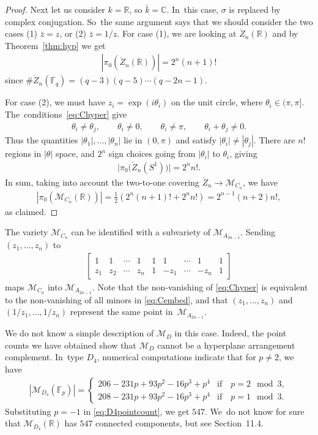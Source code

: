 \documentclass[pdftex]{sigma}%
\def\R{{\mathbb R}}
\def\C{{\mathbb C}}
\def\F{{\mathbb F}}
\def\Uo{{\mathring{U}}}
\def\Zo{{\mathring{Z}}}
\def\M{{\mathcal{M}}}
\numberwithin{equation}{section}
\begin{document}
\begin{proof}
Next let us consider $k = \R$, so $\bar k = \C$. In~this case, $\sigma$ is replaced by complex conjugation. So~the same argument says that we should consider the two cases (1) $\bar z = z$, or (2) $\bar z = 1/z$. For case (1), we are looking at $\Zo_n(\R)$ and by Theorem~\ref{thm:hyp} we get
\begin{gather*}
|\pi_0(\Zo_n(\R))| = 2^{n} (n+1)!
\end{gather*}
since $\#\Zo_n(\F_q) = (q-3)(q-5)\cdots (q-2n-1)$.

For case (2), we must have $z_i = \exp(i \theta_i)$ on the unit circle, where $\theta_i \in (\pi,\pi]$. The~conditions~\eqref{eq:Chyper} give
\begin{gather*}
\theta_i \neq \theta_j, \qquad \theta_i \neq 0, \qquad \theta_i \neq \pi, \qquad \theta_i + \theta_j \neq 0.
\end{gather*}
Thus the quantities $|\theta_1|,\dots, |\theta_n|$ lie in $(0,\pi)$ and satisfy $|\theta_i| \neq |\theta_j|$. There are $n!$ regions in $|\theta|$ space, and $2^n$ sign choices going from $|\theta_i|$ to $\theta_i$, giving
\begin{gather*}
\big|\pi_0\big(\Zo_n(S^1)\big)\big| = 2^n n!.
\end{gather*}
In sum, taking into account the two-to-one covering $\Zo_n \to \M_{C_n}$, we have
\begin{gather*}
|\pi_0( \M_{C_n}(\R))| = \frac{1}{2}\left( 2^n (n+1)! + 2^n n!\right) = 2^{n-1}(n+2) n!,
\end{gather*}
as claimed.
\end{proof}

The variety $\M_{C_n}$ can be identified with a subvariety of $\M_{A_{2n-1}}$. Sending $(z_1,\dots,z_n)$ to
\begin{gather}\label{eq:Cembed}
\begin{bmatrix}
1& 1 & \cdots & 1 &1 & 1 &\cdots &1&1
\\
z_1 & z_2 & \cdots & z_{n} & 1 & -z_1 & \cdots & -z_n & 1
\end{bmatrix}
\end{gather}
maps $\M_{C_n}$ into $\M_{A_{2n-1}}$. Note that the non-vanishing of \eqref{eq:Chyper} is equivalent to the non-vanishing of all minors in \eqref{eq:Cembed}, and that $(z_1,\dots,z_n)$ and $(1/z_1,\dots,1/z_n)$ represent the same point in~$\M_{A_{2n-1}}$.

\bigskip{}
We do not know a simple description of $\M_D$ in this case. Indeed, the point counts we have obtained show that $\M_D$ cannot be a hyperplane arrangement complement. In~type $D_4$, numerical computations indicate that for $p \neq 2$, we have
\begin{gather}\label{eq:D4pointcount}
|\M_{D_4}(\F_p)|= \begin{cases}
206 - 231 p + 93 p^2 - 16 p^3 + p^4 & \mbox{if}\quad p = 2 \mod 3,
\\
208 - 231 p + 93 p^2 - 16 p^3 + p^4 & \mbox{if}\quad p = 1 \mod 3.
\end{cases}
\end{gather}
Substituting $p = -1$ in \eqref{eq:D4pointcount}, we get $547$. We~do not know for sure that $\M_{D_4}(\R)$ has $547$ connected components, but see Section~11.4.
\end{document}
